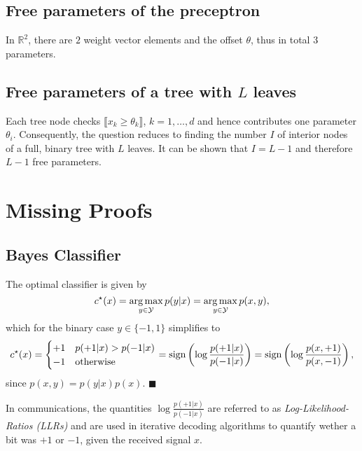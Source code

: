 \documentclass{scrartcl}
\begin{document}
	\subsection{Free parameters of the preceptron}
	In $\mathbb R^2$, there are $2$ weight vector elements and the offset $\theta$, thus in total $3$ parameters.
	\subsection{Free parameters of a tree with $L$ leaves}
	Each tree node checks $\llbracket x_k \geq \theta_k\rrbracket$, $k=1,\dots,d$ and hence contributes one parameter $\theta_i$. Consequently, the question reduces to finding the number $I$ of interior nodes of a full, binary tree with $L$ leaves. It can be shown that $I=L-1$ and therefore $L-1$ free parameters.
	
\section{Missing Proofs}
\subsection{Bayes Classifier}
The optimal classifier is given by
\begin{equation}
	c^\star(x) = \operatorname*{arg\,max}_{y \in \mathcal Y} p(y| x) = \operatorname*{arg\,max}_{y \in \mathcal Y} p(x,y),
\end{equation}
which for the binary case $y\in\lbrace -1,1\rbrace$ simplifies to
\begin{equation}
	c^\star(x) = \begin{cases} +1 &  p(+1|x) > p(-1|x) \\ -1 &\text{otherwise}\end{cases} 
	=  \mathrm{sign} \left( \log  \frac{p(+1|x)}{p(-1|x)}\right)
	=  \mathrm{sign} \left( \log  \frac{p(x,+1)}{p(x,-1)}\right),
\end{equation}
since $p(x,y)=p(y|x)p(x)$. \hfill $\blacksquare$

In communications, the quantities $\log  \frac{p(+1|x)}{p(-1|x)}$ are referred to as \emph{Log-Likelihood-Ratios (LLRs)} and are used in iterative decoding algorithms to quantify wether a bit was $+1$ or $-1$, given the received signal $x$.
\end{document}
